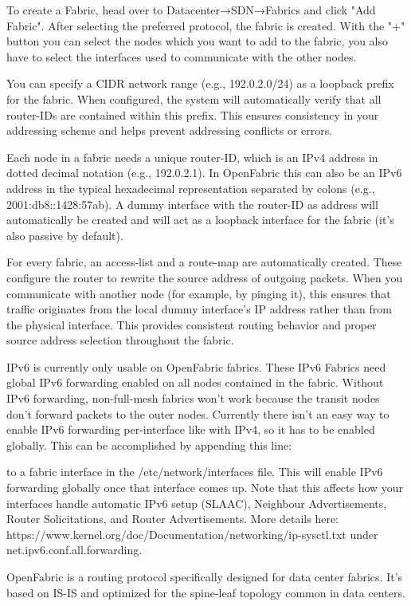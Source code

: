 To create a Fabric, head over to Datacenter→SDN→Fabrics and click "Add Fabric". After selecting the preferred protocol, the fabric is created. With the "+" button you can select the nodes which you want to add to the fabric, you also have to select the interfaces used to communicate with the other nodes.

You can specify a CIDR network range (e.g., 192.0.2.0/24) as a loopback prefix for the fabric. When configured, the system will automatically verify that all router-IDs are contained within this prefix. This ensures consistency in your addressing scheme and helps prevent addressing conflicts or errors.

Each node in a fabric needs a unique router-ID, which is an IPv4 address in dotted decimal notation (e.g., 192.0.2.1). In OpenFabric this can also be an IPv6 address in the typical hexadecimal representation separated by colons (e.g., 2001:db8::1428:57ab). A dummy interface with the router-ID as address will automatically be created and will act as a loopback interface for the fabric (it’s also passive by default).

For every fabric, an access-list and a route-map are automatically created. These configure the router to rewrite the source address of outgoing packets. When you communicate with another node (for example, by pinging it), this ensures that traffic originates from the local dummy interface’s IP address rather than from the physical interface. This provides consistent routing behavior and proper source address selection throughout the fabric.

IPv6 is currently only usable on OpenFabric fabrics. These IPv6 Fabrics need global IPv6 forwarding enabled on all nodes contained in the fabric. Without IPv6 forwarding, non-full-mesh fabrics won’t work because the transit nodes don’t forward packets to the outer nodes. Currently there isn’t an easy way to enable IPv6 forwarding per-interface like with IPv4, so it has to be enabled globally. This can be accomplished by appending this line:

to a fabric interface in the /etc/network/interfaces file. This will enable IPv6 forwarding globally once that interface comes up. Note that this affects how your interfaces handle automatic IPv6 setup (SLAAC), Neighbour Advertisements, Router Solicitations, and Router Advertisements. More details here: https://www.kernel.org/doc/Documentation/networking/ip-sysctl.txt under net.ipv6.conf.all.forwarding.

OpenFabric is a routing protocol specifically designed for data center fabrics. It’s based on IS-IS and optimized for the spine-leaf topology common in data centers.

